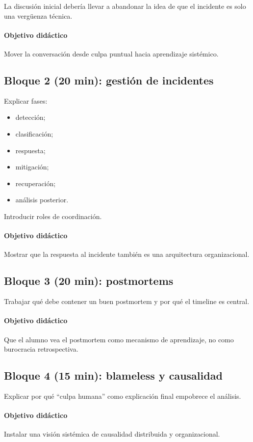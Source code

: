 \documentclass[variant=docente,cover=institutional,mode=screen]{ua-engineering-v6-article}
\begin{document}
La discusión inicial debería llevar a abandonar la idea de que el incidente es solo una vergüenza técnica.

\paragraph{Objetivo didáctico}
Mover la conversación desde culpa puntual hacia aprendizaje sistémico.

\subsection*{Bloque 2 (20 min): gestión de incidentes}
Explicar fases:
\begin{itemize}
\item detección;
\item clasificación;
\item respuesta;
\item mitigación;
\item recuperación;
\item análisis posterior.
\end{itemize}

Introducir roles de coordinación.

\paragraph{Objetivo didáctico}
Mostrar que la respuesta al incidente también es una arquitectura organizacional.

\subsection*{Bloque 3 (20 min): postmortems}
Trabajar qué debe contener un buen postmortem y por qué el timeline es central.

\paragraph{Objetivo didáctico}
Que el alumno vea el postmortem como mecanismo de aprendizaje, no como burocracia retrospectiva.

\subsection*{Bloque 4 (15 min): blameless y causalidad}
Explicar por qué “culpa humana” como explicación final empobrece el análisis.

\paragraph{Objetivo didáctico}
Instalar una visión sistémica de causalidad distribuida y organizacional.
\end{document}
